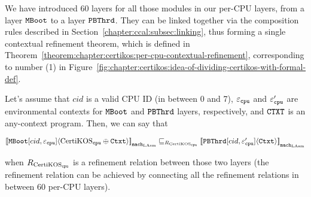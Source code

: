 We have introduced 60 layers for all those modules in our per-CPU layers, from a layer ${\mathrm{\texttt{MBoot}}}$  to a layer 
${{\mathrm{\texttt{PBThrd}}}}$.
They can be linked together via the composition rules described in Section~\ref{chapter:ccal:subsec:linking},
thus forming a single contextual refinement theorem, which is defined in Theorem~\ref{theorem:chapter:certikos:per-cpu-contextual-refinement},
corresponding to number (1) in Figure~\ref{fig:chapter:certikos:idea-of-dividing-certikos-with-formal-def}.
\begin{theorem}
\label{theorem:chapter:certikos:per-cpu-contextual-refinement}
Let's assume that $cid$ is a valid CPU ID (in between 0 and 7), ${\varepsilon}_{{\mathrm{\texttt{cpu}}}}$ and  ${\varepsilon}'_{{\mathrm{\texttt{cpu}}}}$ are 
environmental contexts for ${\mathrm{\texttt{MBoot}}}$  and ${{\mathrm{\texttt{PBThrd}}}}$ layers, respectively, and ${\mathrm{\texttt{CTXT}}}$ is an any-context program. Then, we can say that
\begin{center}
${[\![{{\mathrm{\texttt{MBoot}}}[cid, {\varepsilon}_{{\mathrm{\texttt{cpu}}}}]} \langle {\mathrm{CertiKOS}_{{\mathrm{\texttt{cpu}}}} \oplus {\mathrm{\texttt{Ctxt}}}} \rangle]\!]}_{{\mathrm{\texttt{mach}}}_{\mathrm{LAsm}}} \sqsubseteq_{R_{\mathrm{CertiKOS}_{\mathrm{\texttt{cpu}}}}} {[\![{{{\mathrm{\texttt{PBThrd}}}}[cid, {\varepsilon}'_{{\mathrm{\texttt{cpu}}}}]} \langle {{\mathrm{\texttt{Ctxt}}}} \rangle]\!]}_{{{\mathrm{\texttt{mach}}}_{\mathrm{LAsm}}}}$
\end{center}
when ${R_{\mathrm{CertiKOS}_{\mathrm{\texttt{cpu}}}}}$ is a refinement relation between those two layers (the refinement relation can be achieved by 
connecting all the refinement relations in between 60 per-CPU layers).
\end{theorem}



%
